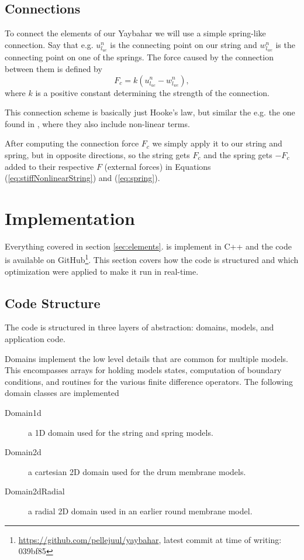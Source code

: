 \documentclass{article}
\begin{document}
\subsection{Connections}
\label{sec:connections}

To connect the elements of our Yaybahar we will use a simple spring-like connection.
Say that e.g. $u^n_{l_{uc}}$ is the connecting point on our string and $w^n_{l_{wc}}$ is the connecting point on one of the springs.
The force caused by the connection between them is defined by
\begin{equation}
  F_c = k \left(u^n_{l_{uc}} - w^n_{l_{wc}}\right),
\end{equation}
where $k$ is a positive constant determining the strength of the connection.

This connection scheme is basically just Hooke's law, but similar the e.g. the one found in \cite{bilbao_modular_2009}, where they also include non-linear terms.

After computing the connection force $F_c$ we simply apply it to our string and spring, but in opposite directions, so the string gets $F_c$ and the spring gets $-F_c$ added to their respective $F$ (external forces) in Equations (\ref{eq:stiffNonlinearString}) and (\ref{eq:spring}).

\section{Implementation}
\label{sec:implementation}

Everything covered in section \ref{sec:elements}. is implement in C++ and the code is available on GitHub\footnote{\url{https://github.com/pellejuul/yaybahar}, latest commit at time of writing: 039bf85}.
This section covers how the code is structured and which optimization were applied to make it run in real-time.

\subsection{Code Structure}

The code is structured in three layers of abstraction: domains, models, and application code.

Domains implement the low level details that are common for multiple models.
This encompasses arrays for holding models states, computation of boundary conditions, and routines for the various finite difference operators.
The following domain classes are implemented
\begin{description}
  \item[Domain1d] a 1D domain used for the string and spring models.
  \item[Domain2d] a cartesian 2D domain used for the drum membrane models. 
  \item[Domain2dRadial] a radial 2D domain used in an earlier round membrane model.
\end{description}
\end{document}
